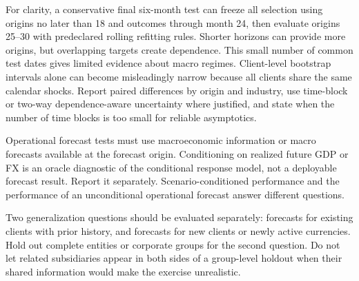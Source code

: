 For clarity, a conservative final six-month test can freeze all selection using origins no later than 18 and outcomes through month 24, then evaluate origins 25--30 with predeclared rolling refitting rules. Shorter horizons can provide more origins, but overlapping targets create dependence. This small number of common test dates gives limited evidence about macro regimes. Client-level bootstrap intervals alone can become misleadingly narrow because all clients share the same calendar shocks. Report paired differences by origin and industry, use time-block or two-way dependence-aware uncertainty where justified, and state when the number of time blocks is too small for reliable asymptotics.

Operational forecast tests must use macroeconomic information or macro forecasts available at the forecast origin. Conditioning on realized future GDP or FX is an oracle diagnostic of the conditional response model, not a deployable forecast result. Report it separately. Scenario-conditioned performance and the performance of an unconditional operational forecast answer different questions.

Two generalization questions should be evaluated separately: forecasts for existing clients with prior history, and forecasts for new clients or newly active currencies. Hold out complete entities or corporate groups for the second question. Do not let related subsidiaries appear in both sides of a group-level holdout when their shared information would make the exercise unrealistic.

